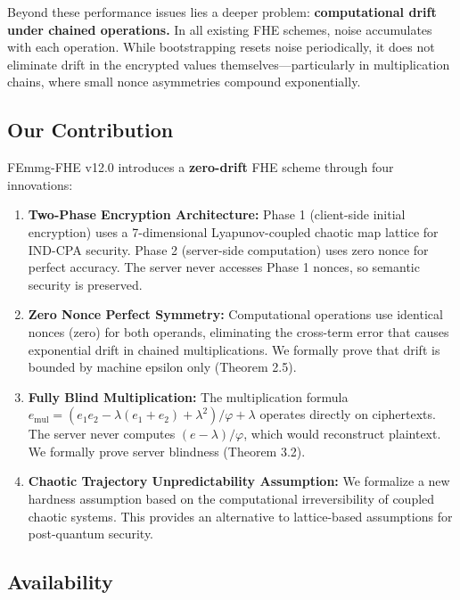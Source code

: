 \documentclass{article}
\begin{document}
Beyond these performance issues lies a deeper problem: \textbf{computational drift under chained operations.} In all existing FHE schemes, noise accumulates with each operation. While bootstrapping resets noise periodically, it does not eliminate drift in the encrypted values themselves---particularly in multiplication chains, where small nonce asymmetries compound exponentially.

\subsection{Our Contribution}

FEmmg-FHE v12.0 introduces a \textbf{zero-drift} FHE scheme through four innovations:

\begin{enumerate}
    \item \textbf{Two-Phase Encryption Architecture:} Phase 1 (client-side initial encryption) uses a 7-dimensional Lyapunov-coupled chaotic map lattice for IND-CPA security. Phase 2 (server-side computation) uses zero nonce for perfect accuracy. The server never accesses Phase 1 nonces, so semantic security is preserved.
    
    \item \textbf{Zero Nonce Perfect Symmetry:} Computational operations use identical nonces (zero) for both operands, eliminating the cross-term error that causes exponential drift in chained multiplications. We formally prove that drift is bounded by machine epsilon only (Theorem 2.5).
    
    \item \textbf{Fully Blind Multiplication:} The multiplication formula $e_{\text{mul}} = (e_1 e_2 - \lambda(e_1 + e_2) + \lambda^2)/\varphi + \lambda$ operates directly on ciphertexts. The server never computes $(e - \lambda)/\varphi$, which would reconstruct plaintext. We formally prove server blindness (Theorem 3.2).
    
    \item \textbf{Chaotic Trajectory Unpredictability Assumption:} We formalize a new hardness assumption based on the computational irreversibility of coupled chaotic systems. This provides an alternative to lattice-based assumptions for post-quantum security.
\end{enumerate}

\subsection{Availability}
\end{document}
